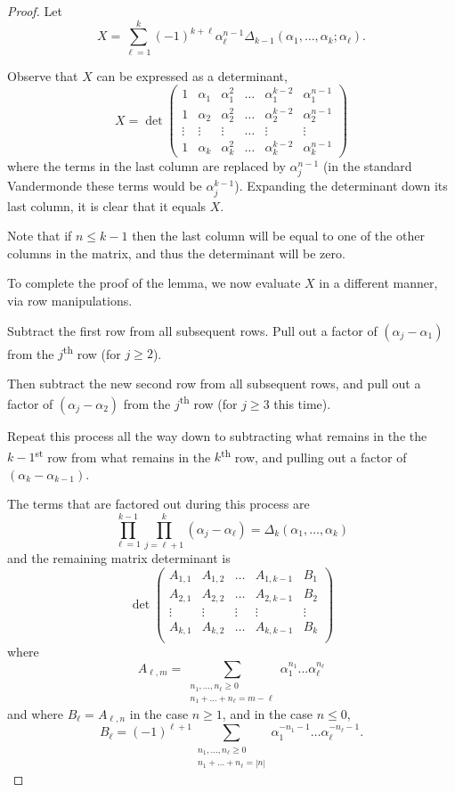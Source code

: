 \documentclass[12pt,a4paper,reqno]{amsart}
\theoremstyle{remark}
\numberwithin{equation}{section}
\begin{document}
\begin{proof}
Let
\begin{equation*}
X = \sum_{\ell=1}^{k} (-1)^{k+\ell} \alpha_\ell^{n-1} \Delta_{k-1}\left(\alpha_1,\dots,\alpha_k ; \alpha_\ell\right) .
\end{equation*}


Observe that $X$ can be expressed as a determinant,
\[
\renewcommand{\arraystretch}{1.4}
X = \det \begin{pmatrix}
1 & \alpha_1 & \alpha_1^2 & \dots & \alpha_1^{k-2} & \alpha_1^{n-1}  \\
1 & \alpha_2 & \alpha_2^2 & \dots & \alpha_2^{k-2} & \alpha_2^{n-1}  \\
\vdots & \vdots & \vdots & \dots & \vdots & \vdots\\
1 & \alpha_{k} & \alpha_{k}^2 & \dots & \alpha_{k}^{k-2}  & \alpha_k^{n-1}
\end{pmatrix}
\]
where the terms in the last column are replaced by $\alpha_j^{n-1}$ (in the standard Vandermonde these terms would be $\alpha_j^{k-1}$). Expanding the determinant down its last column, it is clear that it equals $X$.

Note that if $n\leq k-1$ then the last column will be equal to one of the other columns in the matrix, and thus the determinant will be zero.

To complete the proof of the lemma, we now evaluate $X$ in a  different manner, via row manipulations.

Subtract the first row from all subsequent rows. Pull out a factor of $(\alpha_j-\alpha_1)$ from the $j$\textsuperscript{th} row (for $j\geq 2$).

Then subtract the new second row from all subsequent rows, and pull out a factor of $(\alpha_j-\alpha_2)$ from the $j$\textsuperscript{th} row (for $j\geq 3$ this time).

Repeat this process all the way down to subtracting what remains in the the $k-1$\textsuperscript{st} row from what remains in the $k$\textsuperscript{th} row, and pulling out a factor of $(\alpha_k-\alpha_{k-1})$.

The terms that are factored out during this process are
\[
\prod_{\ell=1}^{k-1} \prod_{j=\ell+1}^k \left(\alpha_j-\alpha_\ell\right)  = \Delta_{k}\left(\alpha_1,\dots,\alpha_{k}\right)
\]
and the remaining matrix determinant is
\[
\det
\begin{pmatrix}
A_{1,1} & A_{1,2} & \dots & A_{1,k-1} & B_{1} \\
A_{2,1} & A_{2,2} & \dots & A_{2,k-1} & B_{2} \\
\vdots & \vdots & \vdots & \vdots & \vdots\\
A_{k,1} & A_{k,2} & \dots & A_{k,k-1} & B_{k} \\
\end{pmatrix}
\]
where
\[
A_{\ell,m} = \sum_{\substack{n_1,\dots,n_{\ell} \geq 0 \\ n_1 + \dots +n_\ell  = m-\ell}} \alpha_1^{n_1} \dots \alpha_{\ell}^{n_\ell}
\]
and where $B_\ell = A_{\ell,n}$ in the case $n \geq 1$, and in the case $n \leq 0$,
\[
B_{\ell} = (-1)^{\ell+1} \sum_{\substack{n_1,\dots,n_{\ell} \geq 0 \\ n_1 + \dots +n_\ell = |n|}} \alpha_1^{-n_1-1} \dots \alpha_{\ell}^{-n_\ell-1}.
\]


\end{proof}
\end{document}
